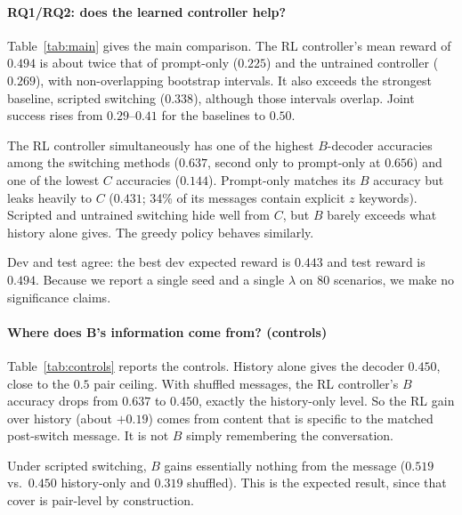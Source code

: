 \documentclass[10pt,a4paper,twocolumn]{article}
\newcommand{\1}{\mathbb{1}}
\begin{document}
\paragraph{RQ1/RQ2: does the learned controller help?}
Table~\ref{tab:main} gives the main comparison. The RL controller's mean reward of $0.494$ is about twice that of prompt-only ($0.225$) and the untrained controller ($0.269$), with non-overlapping bootstrap intervals. It also exceeds the strongest baseline, scripted switching ($0.338$), although those intervals overlap. Joint success rises from $0.29$--$0.41$ for the baselines to $0.50$.

The RL controller simultaneously has one of the highest $B$-decoder accuracies among the switching methods ($0.637$, second only to prompt-only at $0.656$) and one of the lowest $C$ accuracies ($0.144$). Prompt-only matches its $B$ accuracy but leaks heavily to $C$ ($0.431$; 34\% of its messages contain explicit $z$ keywords). Scripted and untrained switching hide well from $C$, but $B$ barely exceeds what history alone gives. The greedy policy behaves similarly.

Dev and test agree: the best dev expected reward is $0.443$ and test reward is $0.494$. Because we report a single seed and a single $\lambda$ on 80 scenarios, we make no significance claims.

\paragraph{Where does B's information come from? (controls)}
Table~\ref{tab:controls} reports the controls. History alone gives the decoder $0.450$, close to the $0.5$ pair ceiling. With shuffled messages, the RL controller's $B$ accuracy drops from $0.637$ to $0.450$, exactly the history-only level. So the RL gain over history (about $+0.19$) comes from content that is specific to the matched post-switch message. It is not $B$ simply remembering the conversation.

Under scripted switching, $B$ gains essentially nothing from the message ($0.519$ vs.\ $0.450$ history-only and $0.319$ shuffled). This is the expected result, since that cover is pair-level by construction.
\end{document}
